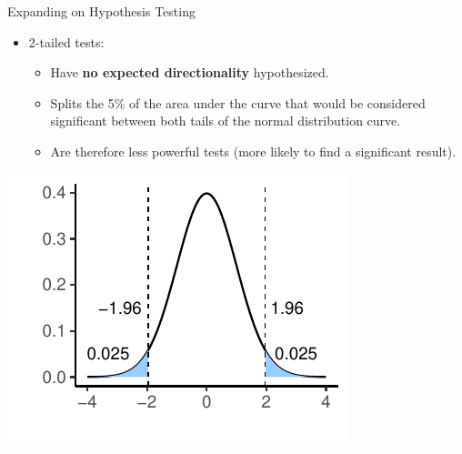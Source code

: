 \documentclass[
  ignorenonframetext,
]{beamer}
\providecommand{\tightlist}{%
  \setlength{\itemsep}{0pt}\setlength{\parskip}{0pt}}
\begin{document}
\begin{frame}{Expanding on Hypothesis Testing}
\label{expanding-on-hypothesis-testing-2}
\begin{itemize}
\tightlist
\item
  2-tailed tests:

  \begin{itemize}
  \tightlist
  \item
    Have \textbf{no expected directionality} hypothesized.
  \item
    Splits the 5\% of the area under the curve that would be considered
    significant between both tails of the normal distribution curve.
  \item
    Are therefore less powerful tests (more likely to find a significant
    result).
  \end{itemize}
\end{itemize}

\centering

\includegraphics{Inferential-Stat-and-Z-test_files/figure-beamer/unnamed-chunk-5-1.pdf}\\
\end{frame}
\end{document}
